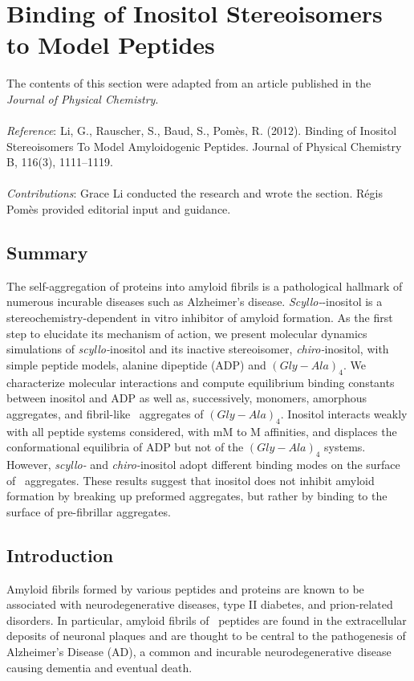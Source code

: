 \chapter{Binding of Inositol Stereoisomers to Model Peptides}

The contents of this section were adapted from an article published in the \emph{Journal of Physical Chemistry}.
\\
\\
\emph{Reference}:
Li, G., Rauscher, S., Baud, S., Pom\`{e}s, R. (2012). Binding of Inositol Stereoisomers To Model Amyloidogenic Peptides. Journal of Physical Chemistry B, 116(3), 1111–1119.
\\
\\
\emph{Contributions}:
Grace Li conducted the research and wrote the section. R\'{e}gis Pom\`{e}s provided editorial input and guidance.

\newpage

\section{Summary}
The self-aggregation of proteins into amyloid fibrils is a pathological hallmark of numerous incurable diseases such as Alzheimer's disease. \textit{Scyllo-}-inositol is a stereochemistry-dependent in vitro inhibitor of amyloid formation. As the first step to elucidate its mechanism of action, we present molecular dynamics simulations of \textit{scyllo-}inositol and its inactive stereoisomer, \textit{chiro-}inositol, with simple peptide models, alanine dipeptide (ADP) and $(Gly-Ala)_4$. We characterize molecular interactions and compute equilibrium binding constants between inositol and ADP as well as, successively, monomers, amorphous aggregates, and fibril-like \bsheet\ aggregates of $(Gly-Ala)_4$.\cite{Balbach:2000p49}
Inositol interacts weakly with all peptide systems considered, with mM to M affinities, and displaces the conformational equilibria of ADP but not of the $(Gly-Ala)_4$ systems. However, \textit{scyllo-} and \textit{chiro-}inositol adopt different binding modes on the surface of \bsheet\ aggregates. These results suggest that inositol does not inhibit amyloid formation by breaking up preformed aggregates, but rather by binding to the surface of pre-fibrillar aggregates.

\section{Introduction}
Amyloid fibrils formed by various peptides and proteins are known to be associated with neurodegenerative diseases, type II diabetes, and prion-related disorders.\cite{Chiti:2006p20} In particular, amyloid fibrils of \abeta\ peptides are found in the extracellular deposits of neuronal plaques and are thought to be central to the pathogenesis of Alzheimer's Disease (AD),\cite{Chiti:2006p20,Hardy:2002p27} a common and incurable neurodegenerative disease causing dementia and eventual death. 

